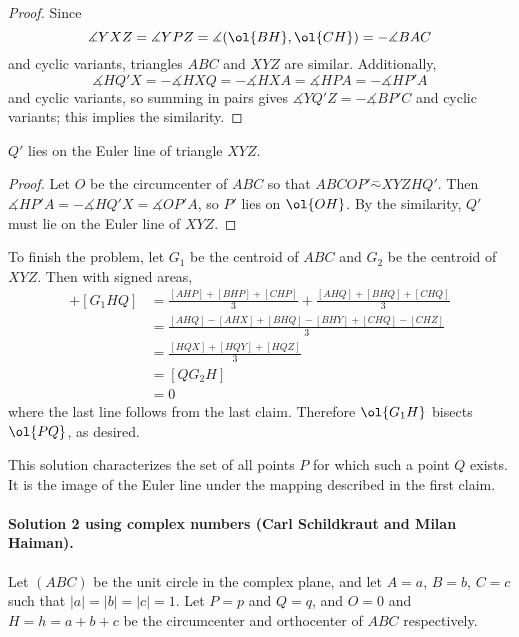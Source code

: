 \begin{proof}
    Since
    \[\measuredangle YXZ = \measuredangle YPZ = \measuredangle(\ol{BH},
    \ol{CH}) = -\measuredangle BAC\]
    and cyclic variants, triangles $ABC$ and $XYZ$ are similar. Additionally,
    \[\measuredangle HQ'X = -\measuredangle HXQ = -\measuredangle HXA =
    \measuredangle HPA = -\measuredangle HP'A\]
    and cyclic variants, so summing in pairs gives $\measuredangle YQ'Z =
    -\measuredangle BP'C$ and cyclic variants; this implies the similarity.
\end{proof}

\begin{claim*}
    $Q'$ lies on the Euler line of triangle $XYZ$.
\end{claim*}

\begin{proof}
  Let $O$ be the circumcenter of $ABC$ so that $ABCOP' \stackrel{-}{\sim} XYZHQ'$. Then
    $\measuredangle HP'A = -\measuredangle HQ'X = \measuredangle OP'A$, so $P'$ lies on
    $\ol{OH}$. By the similarity, $Q'$ must lie on the Euler line of $XYZ$.
\end{proof}

To finish the problem, let $G_1$ be the centroid of $ABC$ and $G_2$ be the
centroid of $XYZ$. Then with signed areas,
\begin{align*}
    [G_1HP] + [G_1HQ] &= \frac{[AHP] + [BHP] + [CHP]}{3} + \frac{[AHQ] + [BHQ] + [CHQ]}{3} \\
    &= \frac{[AHQ] - [AHX] + [BHQ] - [BHY] + [CHQ] - [CHZ]}{3} \\
    &= \frac{[HQX] + [HQY] + [HQZ]}{3} \\
    &= [QG_2H] \\
    &= 0
\end{align*}
where the last line follows from the last claim. Therefore $\ol{G_1H}$
bisects $\ol{PQ}$, as desired.

\begin{remark*}
  This solution characterizes the set of all points $P$ for which such a point
  $Q$ exists. It is the image of the Euler line under the mapping described in
  the first claim.
\end{remark*}

\paragraph{Solution 2 using complex numbers (Carl Schildkraut and Milan Haiman).}
Let $(ABC)$ be the unit circle in the complex plane, and let $A=a$, $B=b$, $C=c$
such that $|a|=|b|=|c|=1$. Let $P=p$ and $Q=q$, and $O=0$ and $H=h=a+b+c$ be the
circumcenter and orthocenter of $ABC$ respectively.

